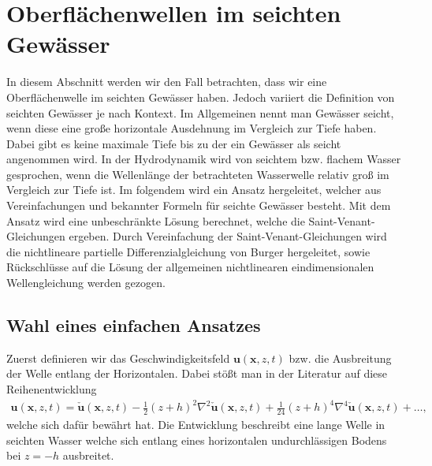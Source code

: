 %
%
%
%
\section{Oberflächenwellen im seichten Gewässer
\label{luke:section:SeichtenGewaesser}}

In diesem Abschnitt werden wir den Fall betrachten, dass wir eine Oberflächenwelle im seichten Gewässer haben. 
Jedoch variiert die Definition von seichten Gewässer je nach Kontext. 
Im Allgemeinen nennt man Gewässer seicht, wenn diese eine große horizontale Ausdehnung im Vergleich zur Tiefe haben. 
Dabei gibt es keine maximale Tiefe bis zu der ein Gewässer als seicht angenommen wird.
In der Hydrodynamik wird von seichtem bzw. flachem Wasser gesprochen, wenn die Wellenlänge der betrachteten Wasserwelle relativ groß im Vergleich zur Tiefe ist.
Im folgendem wird ein Ansatz hergeleitet, welcher aus Vereinfachungen und bekannter Formeln für seichte Gewässer besteht.
Mit dem Ansatz wird eine unbeschränkte Lösung berechnet, welche die Saint-Venant-Gleichungen ergeben.
Durch Vereinfachung der Saint-Venant-Gleichungen wird die nichtlineare partielle Differenzialgleichung von Burger hergeleitet, sowie Rückschlüsse auf die Lösung der allgemeinen nichtlinearen eindimensionalen Wellengleichung werden gezogen. 

\subsection{Wahl eines einfachen Ansatzes}
Zuerst definieren wir das Geschwindigkeitsfeld $\bm{u}(\bm{x},z,t)$ bzw. die Ausbreitung der Welle entlang der Horizontalen.
Dabei stößt man in der Literatur auf diese Reihenentwicklung
\begin{align}
	\bm{u}(\bm{x},z,t) = \check{\bm{u}}(\bm{x},z,t) - \frac{1}{2} (z + h)^2 \nabla^2 \check{\bm{u}}(\bm{x},z,t) + \frac{1}{24} (z + h)^4 \nabla^4 \check{\bm{u}}(\bm{x},z,t) + \ldots,
\end{align}
welche sich dafür bewährt hat.
Die Entwicklung beschreibt eine lange Welle in seichten Wasser welche sich entlang eines horizontalen undurchlässigen Bodens bei $z = -h$ ausbreitet.

